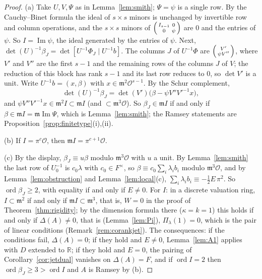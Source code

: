 \documentclass[11pt]{amsart}
\newcommand{\R}{\mathbb{R}}
\theoremstyle{plain}
\theoremstyle{definition}
\begin{document}
\begin{proof}
(a) Take $U,V,\Psi$ as in Lemma~\ref{lem:smith}; $\Psi=\psi$ is a single row. By the Cauchy--Binet formula
the ideal of $s\times s$ minors is unchanged by invertible row and column operations, and the $s\times s$
minors of $\begin{psmallmatrix}I_{s-1}&0\\0&\psi\end{psmallmatrix}$ are $0$ and the entries of $\psi$. So
$I=\operatorname{Im}\psi$, the ideal generated by the entries of $\psi$. Next,
$\det(U)^{-1}\beta_J=\det[U^{-1}\Phi_J\mid U^{-1}b]$. The columns $J$ of $U^{-1}\Phi$ are
$\begin{psmallmatrix}V'\\\psi V''\end{psmallmatrix}$, where $V'$ and $V''$ are the first $s-1$ and the
remaining rows of the columns $J$ of $V$; the reduction of this block has rank $s-1$ and its last row
reduces to $0$, so $\det V'$ is a unit. Write $U^{-1}b=(x,\beta)$ with $x\in\mathfrak m^2\mathcal O^{s-1}$.
By the Schur complement,
\[
 \det(U)^{-1}\beta_J=\det(V')\bigl(\beta-\psi V''V'^{-1}x\bigr),
\]
and $\psi V''V'^{-1}x\in\mathfrak m^2I\subset\mathfrak mI$ (and $\subset\mathfrak m^3\mathcal O$). So
$\beta_J\in\mathfrak mI$ if and only if $\beta\in\mathfrak mI=\mathfrak m\operatorname{Im}\Psi$, which is
Lemma~\ref{lem:smith}; the Ramsey statements are Proposition~\ref{prop:finitetype}(i),(ii).

(b) If $I=\pi^c\mathcal O$, then $\mathfrak mI=\pi^{c+1}\mathcal O$.

(c) By the display, $\beta_J\equiv u\beta$ modulo $\mathfrak m^3\mathcal O$ with $u$ a unit. By
Lemma~\ref{lem:smith} the last row of $U_0^{-1}$ is $c_0\lambda$ with $c_0\in F^\times$, so
$\beta\equiv c_0\sum_i\lambda_ib_i$ modulo $\mathfrak m^3\mathcal O$, and by Lemma~\ref{lem:obstruction} and
Lemma~\ref{lem:local}(c), $\sum_i\lambda_ib_i\equiv-\tfrac12E\,\pi^2$. So $\operatorname{ord}\beta_J\ge2$,
with equality if and only if $E\ne0$. For $I$: in a discrete valuation ring, $I\subset\mathfrak m^2$ if and only
if $\mathfrak mI\subset\mathfrak m^3$, that is, $W=0$ in the proof of Theorem~\ref{thm:rigidity}; by the
dimension formula there ($\kappa=k=1$) this holds if and only if $\Delta(A)\ne0$, that is (Lemma~\ref{lem:Pi}),
$\Pi_\lambda(1)=0$, which is the pair of linear conditions (Remark~\ref{rem:corankjet}). The consequences:
if the conditions fail, $\Delta(A)=0$; if they hold and $E\ne0$, Lemma~\ref{lem:A1} applies with $D$
extended to $\R$; if they hold and $E=0$, the pairing of Corollary~\ref{cor:jetdual} vanishes on
$\Delta(A)=F$, and if $\operatorname{ord}I=2$ then $\operatorname{ord}\beta_J\ge3>\operatorname{ord}I$ and $A$
is Ramsey by (b).
\end{proof}
\end{document}
